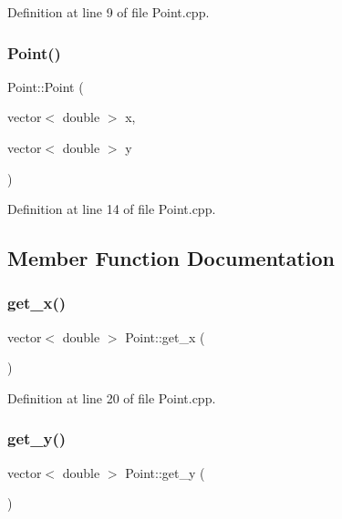 Definition at line 9 of file Point.\+cpp.

\mbox{\label{class_point_ac5bfcc2d69bc85e707d6a656bce77bfe}} 
\subsubsection{\texorpdfstring{Point()}{Point()}\hspace{0.1cm}{\footnotesize\ttfamily [2/2]}}
{\footnotesize\ttfamily Point\+::\+Point (\begin{DoxyParamCaption}\item[{vector$<$ double $>$}]{x,  }\item[{vector$<$ double $>$}]{y }\end{DoxyParamCaption})}



Definition at line 14 of file Point.\+cpp.



\subsection{Member Function Documentation}
\mbox{\label{class_point_a39670bab179c132637bad3ccedbd2a73}} 
\subsubsection{\texorpdfstring{get\+\_\+x()}{get\_x()}}
{\footnotesize\ttfamily vector$<$ double $>$ Point\+::get\+\_\+x (\begin{DoxyParamCaption}{ }\end{DoxyParamCaption})}



Definition at line 20 of file Point.\+cpp.

\mbox{\label{class_point_a93aa3493de3e14400ae635f4780fb29f}} 
\subsubsection{\texorpdfstring{get\+\_\+y()}{get\_y()}}
{\footnotesize\ttfamily vector$<$ double $>$ Point\+::get\+\_\+y (\begin{DoxyParamCaption}{ }\end{DoxyParamCaption})}



